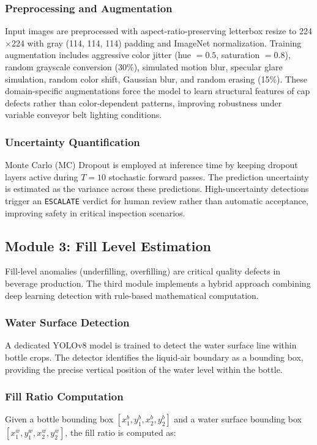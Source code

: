 \documentclass{ieeeaccess}
\begin{document}
\subsubsection{Preprocessing and Augmentation}
Input images are preprocessed with aspect-ratio-preserving letterbox resize to 224$\times$224 with gray (114, 114, 114) padding and ImageNet normalization. Training augmentation includes aggressive color jitter (hue $= 0.5$, saturation $= 0.8$), random grayscale conversion (30\%), simulated motion blur, specular glare simulation, random color shift, Gaussian blur, and random erasing (15\%). These domain-specific augmentations force the model to learn structural features of cap defects rather than color-dependent patterns, improving robustness under variable conveyor belt lighting conditions.

\subsubsection{Uncertainty Quantification}
Monte Carlo (MC) Dropout is employed at inference time by keeping dropout layers active during $T = 10$ stochastic forward passes. The prediction uncertainty is estimated as the variance across these predictions. High-uncertainty detections trigger an \texttt{ESCALATE} verdict for human review rather than automatic acceptance, improving safety in critical inspection scenarios.


\subsection{Module 3: Fill Level Estimation}

Fill-level anomalies (underfilling, overfilling) are critical quality defects in beverage production. The third module implements a hybrid approach combining deep learning detection with rule-based mathematical computation.

\subsubsection{Water Surface Detection}
A dedicated YOLOv8 model is trained to detect the water surface line within bottle crops. The detector identifies the liquid-air boundary as a bounding box, providing the precise vertical position of the water level within the bottle.

\subsubsection{Fill Ratio Computation}
Given a bottle bounding box $[x_1^b, y_1^b, x_2^b, y_2^b]$ and a water surface bounding box $[x_1^w, y_1^w, x_2^w, y_2^w]$, the fill ratio is computed as:
\end{document}
